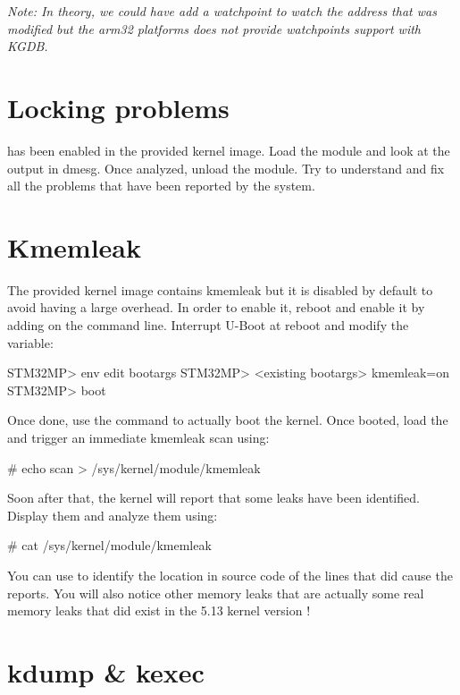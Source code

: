 {\em Note: In theory, we could have add a watchpoint to watch the address that
was modified but the arm32 platforms does not provide watchpoints support with
KGDB.}

\section{Locking problems}

 has been enabled in the provided kernel image.
Load the  module and look at the output in dmesg. Once
analyzed, unload the module. Try to understand and fix all the problems that
have been reported by the  system.

\section{Kmemleak}

The provided kernel image contains kmemleak but it is disabled by default to
avoid having a large overhead. In order to enable it, reboot and enable it by
adding  on the command line. Interrupt U-Boot at reboot and
modify the  variable:

\begin{bashinput}
STM32MP> env edit bootargs
STM32MP> <existing bootargs> kmemleak=on
STM32MP> boot
\end{bashinput}

Once done, use the  command to actually boot the kernel. Once booted,
load the  and trigger an immediate kmemleak scan using:

\begin{bashinput}
# echo scan > /sys/kernel/module/kmemleak
\end{bashinput}

Soon after that, the kernel will report that some leaks have been identified.
Display them and analyze them using:

\begin{bashinput}
# cat /sys/kernel/module/kmemleak
\end{bashinput}

You can use  to identify the location in source code of the
lines that did cause the reports. You will also notice other memory leaks that
are actually some real memory leaks that did exist in the 5.13 kernel version !


\section{kdump \& kexec}

